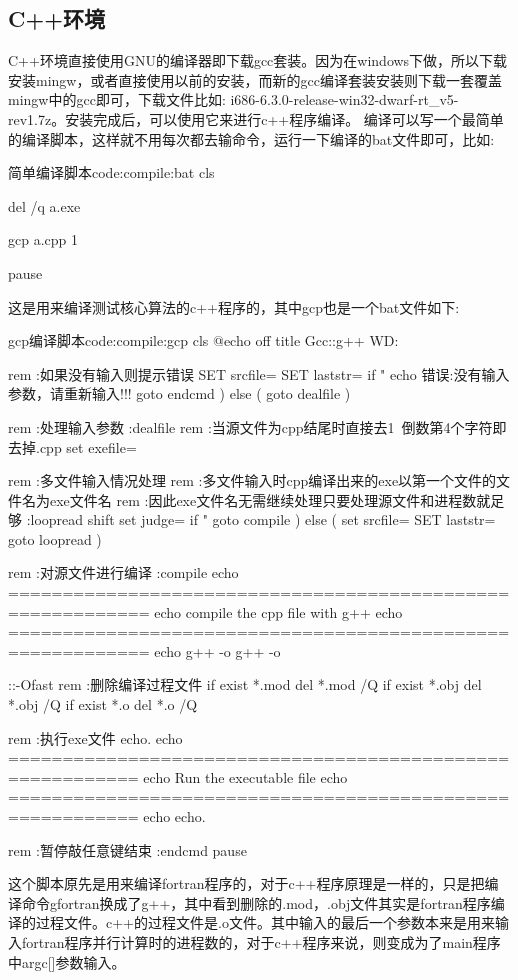 \documentclass[11pt,twoside]{article} %
\begin{document}
\subsection{C++环境}

C++环境直接使用GNU的编译器即下载gcc套装。因为在windows下做，所以下载安装mingw，或者直接使用以前的安装，而新的gcc编译套装安装则下载一套覆盖mingw中的gcc即可，下载文件比如:
i686-6.3.0-release-win32-dwarf-rt\_v5-rev1.7z。安装完成后，可以使用它来进行c++程序编译。
编译可以写一个最简单的编译脚本，这样就不用每次都去输命令，运行一下编译的bat文件即可，比如:
\begin{codebasic}{简单编译脚本}{code:compile:bat}
cls

del /q a.exe

gcp a.cpp 1

pause
\end{codebasic}

这是用来编译测试核心算法的c++程序的，其中gcp也是一个bat文件如下:
\begin{codebasic}{gcp编译脚本}{code:compile:gcp}
cls
@echo off
title Gcc::g++ WD:%

rem :如果没有输入则提示错误
   SET srcfile=%
   SET laststr=%
   if "%
      echo 错误:没有输入参数，请重新输入!!!
      goto endcmd
   ) else (
      goto dealfile
   )

rem :处理输入参数
:dealfile
   rem :当源文件为cpp结尾时直接去1~倒数第4个字符即去掉.cpp
   set exefile=%

   rem :多文件输入情况处理
   rem :多文件输入时cpp编译出来的exe以第一个文件的文件名为exe文件名
   rem :因此exe文件名无需继续处理只要处理源文件和进程数就足够
   :loopread
      shift
      set judge=%
      if "%
         goto compile
      ) else (
         set srcfile=%
         SET laststr=%
         goto loopread
      )

rem :对源文件进行编译
:compile
   echo ===========================================================
   echo compile the cpp file with g++
   echo ===========================================================
   echo g++ -o %
   g++ -o %


::-Ofast
rem :删除编译过程文件
   if exist *.mod del *.mod /Q
   if exist *.obj del *.obj /Q
   if exist *.o del *.o /Q

rem :执行exe文件
   echo.
   echo ==========================================================
   echo Run the executable file
   echo ==========================================================
   echo %
   echo.

rem :暂停敲任意键结束
:endcmd
   pause
\end{codebasic}
这个脚本原先是用来编译fortran程序的，对于c++程序原理是一样的，只是把编译命令gfortran换成了g++，其中看到删除的.mod，.obj文件其实是fortran程序编译的过程文件。c++的过程文件是.o文件。其中输入的最后一个参数本来是用来输入fortran程序并行计算时的进程数的，对于c++程序来说，则变成为了main程序中argc[]参数输入。
\end{document}
